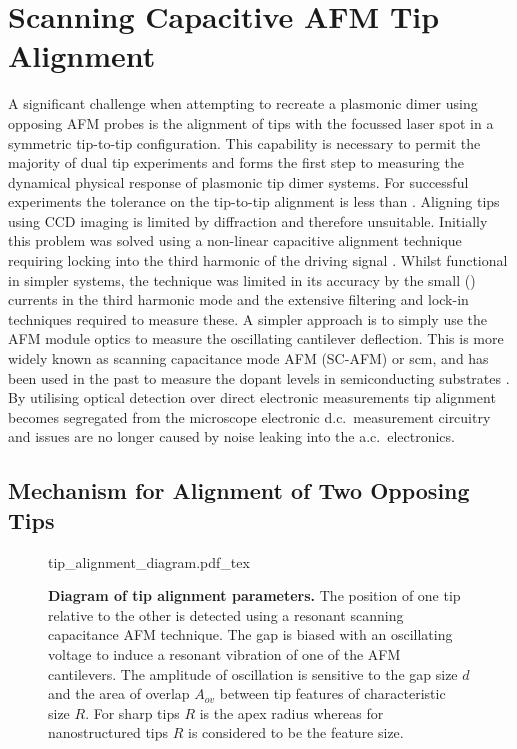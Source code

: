 \documentclass{article}
\begin{document}
\section{Scanning Capacitive AFM Tip Alignment}
\label{sec:tip_alignment}

A significant challenge when attempting to recreate a plasmonic dimer using opposing AFM probes is the alignment of tips with the focussed laser spot in a symmetric tip-to-tip configuration. This capability is necessary to permit the majority of dual tip experiments and forms the first step to measuring the dynamical physical response of plasmonic tip dimer systems. For successful experiments the tolerance on the tip-to-tip alignment is less than . Aligning tips using CCD imaging is limited by diffraction and therefore unsuitable. Initially this problem was solved using a non-linear capacitive alignment technique requiring locking into the third harmonic of the driving signal \cite{savage2011}. Whilst functional in simpler systems, the technique was limited in its accuracy by the small () currents in the third harmonic mode and the extensive filtering and lock-in techniques required to measure these. A simpler approach is to simply use the AFM module optics to measure the oscillating cantilever deflection. This is more widely known as scanning capacitance mode AFM (SC-AFM) or \gls{scm}, and has been used in the past to measure the dopant levels in semiconducting substrates \cite{matey1985scanning, bugg1988scanning, huang1995quantitative, kopanski1996scanning, girard2001electrostatic}. By utilising optical detection over direct electronic measurements tip alignment becomes segregated from the microscope electronic d.c.\ measurement circuitry and issues are no longer caused by noise leaking into the a.c.\ electronics.

\subsection{Mechanism for Alignment of Two Opposing Tips}

\begin{figure}[bt]
\centering
\fontsize{10pt}{1em}\selectfont
\def\svgwidth{0.65\textwidth}
{tip_alignment_diagram.pdf_tex}
\caption[Diagram of tip alignment parameters]{\textbf{Diagram of tip alignment parameters.} The position of one tip relative to the other is detected using a resonant scanning capacitance AFM technique. The gap is biased with an oscillating voltage to induce a resonant vibration of one of the AFM cantilevers. The amplitude of oscillation is sensitive to the gap size $d$ and the area of overlap $A_{ov}$ between tip features of characteristic size $R$. For sharp tips $R$ is the apex radius whereas for nanostructured tips $R$ is considered to be the feature size.}
\label{fig:tip_alignment_diagram}
\end{figure}
\end{document}
